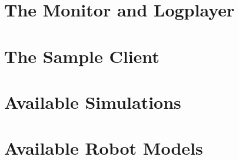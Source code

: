






\section{The Monitor and Logplayer}


\section{The Sample Client}



\section{Available Simulations}


\section{Available Robot Models}


